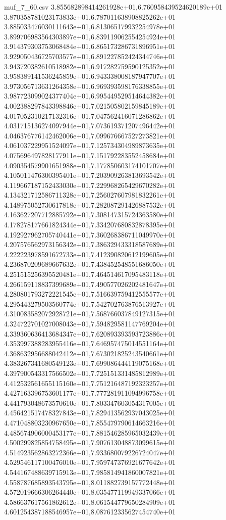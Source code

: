 \begin{filecontents*}{muf_7_60.csv}
3.855682898414261928e+01,6.760958439524620189e+01
3.870358781023173833e+01,6.787011638908825262e+01
3.885033476030111643e+01,6.813065179932254978e+01
3.899706983564303897e+01,6.839119062554254924e+01
3.914379303753068484e+01,6.865173286731896951e+01
3.929050436725703577e+01,6.891227852424344746e+01
3.943720382610518982e+01,6.917282759590125352e+01
3.958389141536245859e+01,6.943338008187947707e+01
3.973056713631264358e+01,6.969393598176338855e+01
3.987723099024377404e+01,6.995449529514644382e+01
4.002388297843398846e+01,7.021505802159845189e+01
4.017052310217132316e+01,7.047562416071286862e+01
4.031715136274097944e+01,7.073619371207496442e+01
4.046376776142462006e+01,7.099676667527273821e+01
4.061037229951524097e+01,7.125734304989873635e+01
4.075696497828177911e+01,7.151792283552458684e+01
4.090354579901651988e+01,7.177850603174101707e+01
4.105011476300395401e+01,7.203909263813693542e+01
4.119667187152433030e+01,7.229968265429670282e+01
4.134321712586711328e+01,7.256027607981832261e+01
4.148975052730617818e+01,7.282087291426887532e+01
4.163627207712885792e+01,7.308147315724363580e+01
4.178278177661824344e+01,7.334207680832878395e+01
4.192927962705740441e+01,7.360268386711049970e+01
4.207576562973156342e+01,7.386329433318587689e+01
4.222223978591672733e+01,7.412390820612199605e+01
4.236870209689667632e+01,7.438452548551686050e+01
4.251515256395520481e+01,7.464514617095483118e+01
4.266159118837399689e+01,7.490577026202481647e+01
4.280801793272221545e+01,7.516639759412555577e+01
4.295443279503560774e+01,7.542702763876513927e+01
4.310083582072928721e+01,7.568766037849127315e+01
4.324722701027008043e+01,7.594829581147769204e+01
4.339360636413684347e+01,7.620893393593723886e+01
4.353997388283955416e+01,7.646957475014551164e+01
4.368632956688042412e+01,7.673021825243540661e+01
4.383267341680549123e+01,7.699086444119075168e+01
4.397900543317566502e+01,7.725151331485812989e+01
4.412532561655115160e+01,7.751216487192323257e+01
4.427163396753601177e+01,7.777281911094996758e+01
4.441793048673570610e+01,7.803347603054317005e+01
4.456421517478327843e+01,7.829413562937043025e+01
4.471048803230967650e+01,7.855479790614663216e+01
4.485674906000453177e+01,7.881546285965032439e+01
4.500299825854758495e+01,7.907613048873099615e+01
4.514923562863272366e+01,7.933680079226724047e+01
4.529546117100476010e+01,7.959747376921677642e+01
4.544167488639715913e+01,7.985814941860007821e+01
4.558787685893543795e+01,8.011882739157772448e+01
4.572019666306264440e+01,8.035477119949337066e+01
4.586637617561862612e+01,8.061544779650284909e+01
4.601254387188546957e+01,8.087612335627454740e+01

\end{filecontents*}
